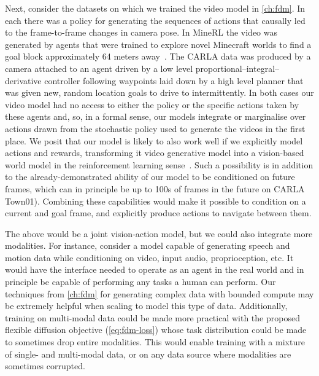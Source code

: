 Next, consider the datasets on which we trained the video model in \cref{ch:fdm}. In each there was a policy for generating the sequences of actions that causally led to the frame-to-frame changes in camera pose. In MineRL the video was generated by agents that were trained to explore novel Minecraft worlds to find a goal block approximately 64 meters away~\citep{saxena2021clockwork}. The CARLA data was produced by a camera attached to an agent driven by a low level proportional–integral–derivative controller following waypoints laid down by a high level planner that was given new, random location goals to
drive to intermittently. In both cases our video model had no access to either the policy or the specific actions taken by these agents and, so, in a formal sense, our models integrate or marginalise over actions drawn from the stochastic policy used to generate the videos in the first place. We posit that our model is likely to also work well if we explicitly model actions and rewards, transforming it video generative model into a vision-based world model in the reinforcement learning sense~\citep{kaiser2019model}. Such a possibility is in addition to the already-demonstrated ability of our model to be conditioned on future frames, which can in principle be up to 100s of frames in the future on CARLA Town01). Combining these capabilities would make it possible to condition on a current and goal frame, and explicitly produce actions to navigate between them.

The above would be a joint vision-action model, but we could also integrate more modalities. For instance, consider a model capable of generating speech and motion data while conditioning on video, input audio, proprioception, etc. It would have the interface needed to operate as an agent in the real world and in principle be capable of performing any tasks a human can perform. Our techniques from \cref{ch:fdm} for generating complex data with bounded compute may be extremely helpful when scaling to model this type of data. Additionally, training on multi-modal data could be made more practical with the proposed flexible diffusion objective (\cref{eq:fdm-loss}) whose task distribution could be made to sometimes drop entire modalities. This would enable training with a mixture of single- and multi-modal data, or on any data source where modalities are sometimes corrupted.






